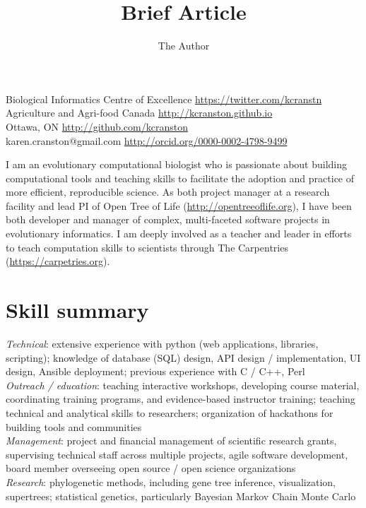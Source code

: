 \documentclass[10pt]{article}
\title{Brief Article}
\author{The Author}
\begin{document}
\noindent Biological Informatics Centre of Excellence \hfill \url{https://twitter.com/kcranstn} \\
Agriculture and Agri-food Canada  \hfill \url{http://kcranston.github.io} \\
Ottawa, ON \hfill  \url{http://github.com/kcranston} \\
karen.cranston@gmail.com  \hfill \url{http://orcid.org/0000-0002-4798-9499}

\vspace{0.4cm}
I am an evolutionary computational biologist who is passionate about building computational tools and teaching skills to facilitate the adoption and practice of more efficient, reproducible science. As both project manager at a research facility and lead PI of Open Tree of Life (\url{http://opentreeoflife.org}), I have been both developer and manager of complex, multi-faceted software projects in evolutionary informatics. I am deeply involved as a teacher and leader in efforts to teach computation skills to scientists through The Carpentries (\url{https://carpetries.org}). 

\section*{Skill summary}

\emph{Technical}: extensive experience with python (web applications, libraries, scripting); knowledge of database (SQL) design, API design / implementation, UI design, Ansible deployment; previous experience with C / C++, Perl \\

\emph{Outreach / education}: teaching interactive workshops, developing course material, coordinating training programs, and evidence-based instructor training; teaching technical and analytical skills to researchers; organization of hackathons for building tools and communities \\ 

\emph{Management}: project and financial management of scientific research grants, supervising technical staff across multiple projects, agile software development, board member overseeing open source / open science organizations   \\

\emph{Research}: phylogenetic methods, including gene tree inference, visualization, supertrees; statistical genetics, particularly Bayesian Markov Chain Monte Carlo \\
\end{document}
